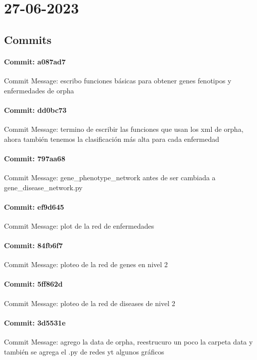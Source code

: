 \documentclass{article}
\begin{document}
\section{27-06-2023}
\subsection{Commits}
\paragraph{Commit: a087ad7}
Commit Message: escribo funciones básicas para obtener genes fenotipos y enfermedades de orpha

\paragraph{Commit: dd0bc73}
Commit Message: termino de escribir las funciones que usan los xml de orpha, ahora también tenemos la clasificación más alta para cada enfermedad

\paragraph{Commit: 797aa68}
Commit Message: gene_phenotype_network antes de ser cambiada a gene_disease_network.py

\paragraph{Commit: ef9d645}
Commit Message: plot de la red de enfermedades

\paragraph{Commit: 84fb6f7}
Commit Message: ploteo de la red de genes en nivel 2

\paragraph{Commit: 5ff862d}
Commit Message: ploteo de la red de diseases de nivel 2

\paragraph{Commit: 3d5531e}
Commit Message: agrego la data de orpha, reestrucuro un poco la carpeta data y también se agrega el .py de redes yt algunos gráficos

\end{document}
